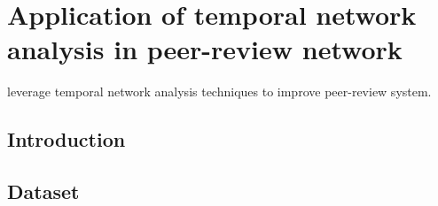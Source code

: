 \documentclass[twoside,phd]{iitkgp}
\begin{document}
\sloppy

 \frontmatter


\makepreliminarypages

 \singlespace

 \tableofcontents
 \clearemptydoublepage

% 

 \listoffigures
 \clearemptydoublepage

 \listoftables
 \clearemptydoublepage




\onehalfspace


\mainmatter
\addtolength{\parskip}{0.7\baselineskip}

\abovedisplayskip=13pt
\belowdisplayskip=13pt
\setcounter{secnumdepth}{3}
\setcounter{tocdepth}{3}
%







\clearpage
\clearpage

\clearpage
\clearpage




\clearpage
\clearpage

\chapter{Application of temporal network analysis in peer-review network}

leverage temporal network analysis techniques to improve peer-review system.

\section{Introduction}






%

\section{Dataset}
\end{document}
